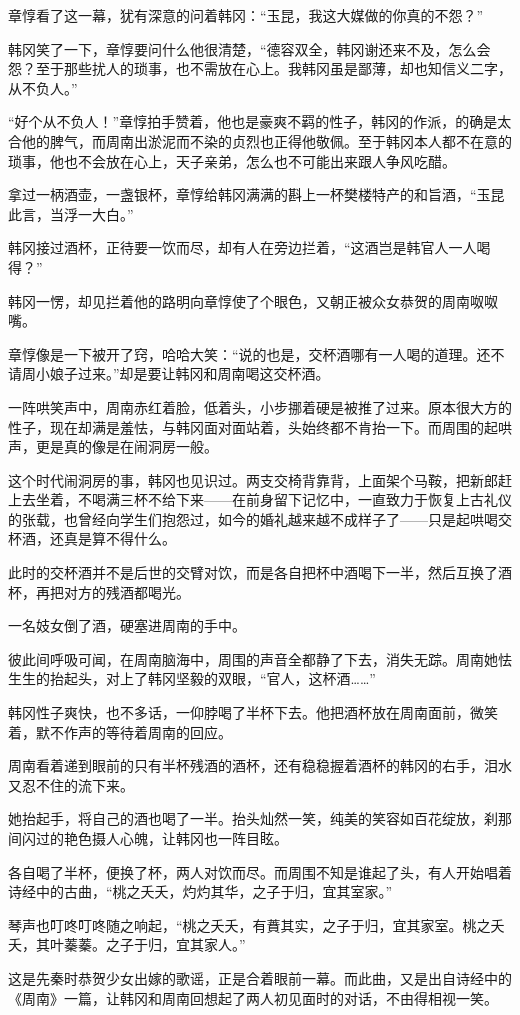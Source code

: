 章惇看了这一幕，犹有深意的问着韩冈：“玉昆，我这大媒做的你真的不怨？”

韩冈笑了一下，章惇要问什么他很清楚，“德容双全，韩冈谢还来不及，怎么会怨？至于那些扰人的琐事，也不需放在心上。我韩冈虽是鄙薄，却也知信义二字，从不负人。”

“好个从不负人！”章惇拍手赞着，他也是豪爽不羁的性子，韩冈的作派，的确是太合他的脾气，而周南出淤泥而不染的贞烈也正得他敬佩。至于韩冈本人都不在意的琐事，他也不会放在心上，天子亲弟，怎么也不可能出来跟人争风吃醋。

拿过一柄酒壶，一盏银杯，章惇给韩冈满满的斟上一杯樊楼特产的和旨酒，“玉昆此言，当浮一大白。”

韩冈接过酒杯，正待要一饮而尽，却有人在旁边拦着，“这酒岂是韩官人一人喝得？”

韩冈一愣，却见拦着他的路明向章惇使了个眼色，又朝正被众女恭贺的周南呶呶嘴。

章惇像是一下被开了窍，哈哈大笑：“说的也是，交杯酒哪有一人喝的道理。还不请周小娘子过来。”却是要让韩冈和周南喝这交杯酒。

一阵哄笑声中，周南赤红着脸，低着头，小步挪着硬是被推了过来。原本很大方的性子，现在却满是羞怯，与韩冈面对面站着，头始终都不肯抬一下。而周围的起哄声，更是真的像是在闹洞房一般。

这个时代闹洞房的事，韩冈也见识过。两支交椅背靠背，上面架个马鞍，把新郎赶上去坐着，不喝满三杯不给下来——在前身留下记忆中，一直致力于恢复上古礼仪的张载，也曾经向学生们抱怨过，如今的婚礼越来越不成样子了——只是起哄喝交杯酒，还真是算不得什么。

此时的交杯酒并不是后世的交臂对饮，而是各自把杯中酒喝下一半，然后互换了酒杯，再把对方的残酒都喝光。

一名妓女倒了酒，硬塞进周南的手中。

彼此间呼吸可闻，在周南脑海中，周围的声音全都静了下去，消失无踪。周南她怯生生的抬起头，对上了韩冈坚毅的双眼，“官人，这杯酒……”

韩冈性子爽快，也不多话，一仰脖喝了半杯下去。他把酒杯放在周南面前，微笑着，默不作声的等待着周南的回应。

周南看着递到眼前的只有半杯残酒的酒杯，还有稳稳握着酒杯的韩冈的右手，泪水又忍不住的流下来。

她抬起手，将自己的酒也喝了一半。抬头灿然一笑，纯美的笑容如百花绽放，刹那间闪过的艳色摄人心魄，让韩冈也一阵目眩。

各自喝了半杯，便换了杯，两人对饮而尽。而周围不知是谁起了头，有人开始唱着诗经中的古曲，“桃之夭夭，灼灼其华，之子于归，宜其室家。”

琴声也叮咚叮咚随之响起，“桃之夭夭，有蕡其实，之子于归，宜其家室。桃之夭夭，其叶蓁蓁。之子于归，宜其家人。”

这是先秦时恭贺少女出嫁的歌谣，正是合着眼前一幕。而此曲，又是出自诗经中的《周南》一篇，让韩冈和周南回想起了两人初见面时的对话，不由得相视一笑。

